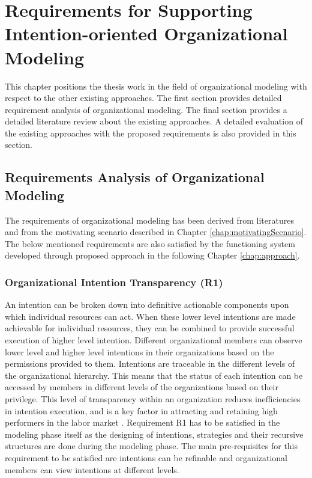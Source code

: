 \chapter{Requirements for Supporting Intention-oriented Organizational Modeling}
\label{chap:analysis}
This chapter positions the thesis work in the field of organizational modeling with respect to the other existing approaches. The first section provides detailed requirement analysis of organizational modeling. The final section provides a detailed literature review about the existing approaches. A detailed evaluation of the existing approaches with the proposed requirements is also provided in this section.

\section{Requirements Analysis of Organizational Modeling}
\label{sec:requirementssupoorting}
The requirements of organizational modeling has been derived from literatures \cite{McManus2007, Mandic2010 ,Bleistein2006, Lacom, Brambilla2012} and from the motivating scenario described in Chapter \ref{chap:motivatingScenario}. The below mentioned requirements are also satisfied by the functioning system developed through proposed approach in the following Chapter \ref{chap:approach}.

\subsection{Organizational Intention Transparency (R1)}
An intention can be broken down into definitive actionable components upon which individual resources can act. When these lower level intentions are made achievable for individual resources, they can be combined to provide successful execution of higher level intention. Different organizational members can observe lower level and higher level intentions in their organizations based on the permissions provided to them. Intentions are traceable in the different levels of the organizational hierarchy. This means that the status of each intention can be accessed by members in different levels of the organizations based on their privilege. This level of transparency within an organization reduces inefficiencies in intention execution, and is a key factor in attracting and retaining high performers in the labor market \cite{McManus2007}. Requirement R1 has to be satisfied in the modeling phase itself as the designing of intentions, strategies and their recursive structures are done during the modeling phase. The main pre-requisites for this requirement to be satisfied are intentions can be refinable and organizational members can view intentions at different levels. 

